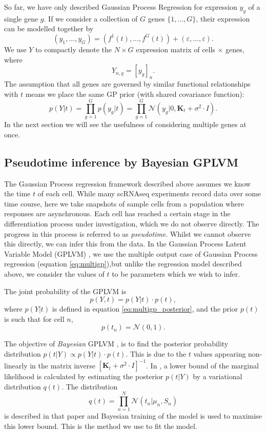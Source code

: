 So far, we have only described Gaussian Process Regression for expression $ y_g $ of a single gene $ g $. If we consider a collection of $ G $ genes $ \{1, \ldots, G\} $, their expression can be modelled together by
\begin{equation}
\label{eq:multigp}
(y_{1}, \ldots, y_{G}) = (f^{1}(t), \ldots, f^{G}(t)) + (\varepsilon, \ldots, \varepsilon).
\end{equation}
We use $ Y $ to compactly denote the $ N \times G $ expression matrix of cells $ \times $ genes, where
\[ Y_{n, g} = [y_{g}]_n. \]
The assumption that all genes are governed by similar functional relationships with $ t $ means we place the same GP prior (with shared covariance function):
\begin{equation}
\label{eq:multigp_posterior}
p(Y | t) = \prod_{g = 1}^G p(y_{g} | t) = \prod_{g = 1}^G \mathcal{N}(y_{g} | 0, \bm{K}_{t} + \sigma^2 \cdot I).
\end{equation}
In the next section we will see the usefulness of considering multiple genes at once.

\subsection{Pseudotime inference by Bayesian GPLVM}

The Gaussian Process regression framework described above assumes we know the time $ t $ of each cell. While many scRNAseq experiments record data over some time course, here we take snapshots of sample cells from a population where responses are asynchronous. Each cell has reached a certain stage in the differentiation process under investigation, which we do not observe directly. The progress in this process is referred to as \textit{pseudotime}. Whilst we cannot observe this directly, we can infer this from the data. In the Gaussian Process Latent Variable Model (GPLVM) \cite{Lawrence2006-it}, we use the multiple output case of Gaussian Process regression (equation \ref{eq:multigp}),but unlike the regression model described above, we consider the values of $ t $ to be parameters which we wish to infer.

The joint probability of the GPLVM is
\[ p(Y, t) = p(Y | t) \cdot p(t), \]
where $ p(Y | t) $ is defined in equation \ref{eq:multigp_posterior}, and the prior $ p(t) $ is such that for cell $ n $,
\[ p(t_n) = \mathcal{N}(0, 1). \]

The objective of \textit{Bayesian} GPLVM \cite{Titsias2010-hq}, is to find the posterior probability distribution $ p(t | Y) \propto p(Y | t) \cdot p(t) $. This is due to the $ t $ values appearing non-linearly in the matrix inverse $ [\bm{K}_t + \sigma^2 \cdot I]^{-1} $. In \cite{Titsias2010-hq}, a lower bound of the marginal likelihood is calculated by estimating the  posterior $ p(t | Y) $ by a variational distribution $ q(t). $ The distribution
\[ q(t) = \prod_{n=1}^N \mathcal{N} (t_n | \mu_n, S_n ) \]
is described in that paper and Bayesian training of the model is used to maximise this lower bound. This is the method we use to fit the model.

